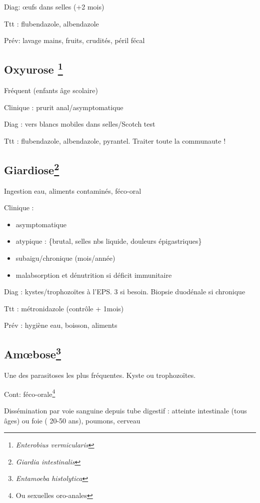 \documentclass[11pt]{article}
\begin{document}
Diag: \oe{}ufs dans selles (+2 mois)

Ttt : flubendazole, albendazole

Prév: lavage mains, fruits, crudités, péril fécal

\subsection{Oxyurose \footnote{\emph{Enterobius vermicularis}}}
\label{sec:orgee706ce}

Fréquent (enfants âge scolaire)

Clinique : prurit anal/asymptomatique

Diag : vers blancs mobiles dans selles/Scotch test

Ttt : flubendazole, albendazole, pyrantel. Traiter toute la communaute !

\subsection{Giardiose\footnote{\emph{Giardia intestinalis}}}
\label{sec:orge5fa6ee}

Ingestion eau, aliments contaminés, féco-oral

Clinique : 
\begin{itemize}
\item asymptomatique
\item atypique : \{brutal, selles nbs liquide, douleurs épigastriques\}
\item subaigu/chronique (mois/année)
\item malabsorption et dénutrition si déficit immunitaire
\end{itemize}

Diag : kystes/\gls{trophozoïtes} à l'EPS. \texttimes{} 3 si besoin. Biopsie duodénale
si chronique

Ttt : métronidazole (contrôle + 1mois)

Prév : hygiène eau, boisson, aliments

\subsection{Am\oe{}bose\footnote{\emph{Entamoeba histolytica}}}
\label{sec:org8c4004d}

Une des parasitoses les	plus fréquentes. Kyste ou trophozoïtes.

Cont: féco-orale\footnote{Ou sexuelles oro-anales}

Dissémination par voie sanguine depuis tube digestif : atteinte intestinale
(tous âges) ou foie (\male{} 20-50 ans), poumons, cerveau
\end{document}
